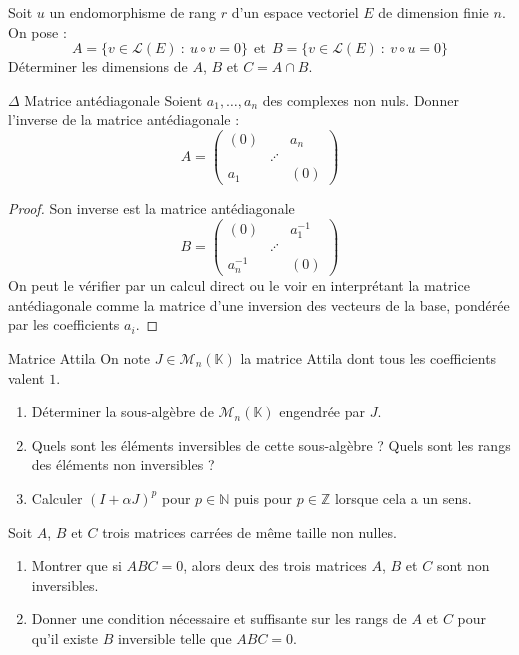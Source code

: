 \documentclass[french,a4paper]{article}
\newcommand{\N}{\mathbb{N}}
\newcommand{\Z}{\mathbb{Z}}
\newcommand{\K}{\mathbb{K}}
\newcommand{\inv}{^{-1}}
\theoremstyle{plain}
\theoremstyle{definition}
\theoremstyle{remark}
\begin{document}
\begin{ex}{}
	Soit $u$ un endomorphisme de rang $r$ d'un espace vectoriel $E$ de dimension finie $n$. On pose : $$A=\{v\in\mathcal{L}(E)\ : \ u\circ v=0\}\ \ \text{et}\ \ B=\{v\in\mathcal{L}(E)\ : \ v\circ u=0\}$$ Déterminer les dimensions de $A$, $B$ et $C=A\cap B$.
\end{ex}

\begin{ex}{$\Delta$ Matrice antédiagonale}
	Soient $a_1,\ldots,a_n$ des complexes non nuls. Donner l'inverse de la matrice antédiagonale : $$A=\begin{pmatrix}
		(0)&&a_n \\
		&\iddots&\\
		a_1&&(0)
	\end{pmatrix}$$
\end{ex}
\begin{proof}
	Son inverse est la matrice antédiagonale $$B=\begin{pmatrix}
		(0)&&a_1\inv \\
		&\iddots&\\
		a_n\inv&&(0)
	\end{pmatrix}$$ On peut le vérifier par un calcul direct ou le voir en interprétant la matrice antédiagonale comme la matrice d'une inversion des vecteurs de la base, pondérée par les coefficients $a_i$.
\end{proof}

\begin{ex}{Matrice Attila}
	On note $J\in\mathcal{M}_n(\K)$ la matrice Attila dont tous les coefficients valent $1$.
	\begin{enumerate}
		\item Déterminer la sous-algèbre de $\mathcal{M}_n(\K)$ engendrée par $J$.
		\item Quels sont les éléments inversibles de cette sous-algèbre ? Quels sont les rangs des éléments non inversibles ?
		\item Calculer $(I+\alpha J)^p$ pour $p\in\N$ puis pour $p\in\Z$ lorsque cela a un sens.
	\end{enumerate}
\end{ex}

\begin{ex}{}
	Soit $A$, $B$ et $C$ trois matrices carrées de même taille non nulles.
	\begin{enumerate}
		\item Montrer que si $ABC=0$, alors deux des trois matrices $A$, $B$ et $C$ sont non inversibles.
		\item Donner une condition nécessaire et suffisante sur les rangs de $A$ et $C$ pour qu'il existe $B$ inversible telle que $ABC=0$.
	\end{enumerate}
\end{ex}
\end{document}
